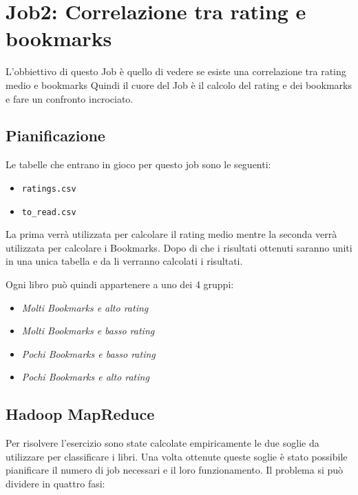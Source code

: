\section{Job2: Correlazione tra rating e bookmarks}

L'obbiettivo di questo Job è quello di vedere se esiste una correlazione tra rating medio e bookmarks
Quindi il cuore del Job è il calcolo del rating e dei bookmarks e fare un confronto incrociato.

\subsection{Pianificazione}
Le tabelle che entrano in gioco per questo job sono le seguenti:
\begin{itemize}
    \item \texttt{ratings.csv}
    \item \texttt{to\_read.csv}
\end{itemize}

La prima verrà utilizzata per calcolare il rating medio mentre la seconda verrà utilizzata per calcolare i Bookmarks.
Dopo di che i risultati ottenuti saranno uniti in una unica tabella e da li verranno calcolati i risultati.

Ogni libro può quindi appartenere a uno dei 4 gruppi:
\begin{itemize}
    \item \textit{Molti Bookmarks e alto rating}
    \item \textit{Molti Bookmarks e basso rating}
    \item \textit{Pochi Bookmarks e basso rating}
    \item \textit{Pochi Bookmarks e alto rating}
\end{itemize}

\subsection{Hadoop MapReduce}

Per risolvere l'esercizio sono state calcolate empiricamente le due soglie da utilizzare per classificare i libri.
Una volta ottenute queste soglie è stato possibile pianificare il numero di job necessari e il loro funzionamento.
Il problema si può dividere in quattro fasi:

